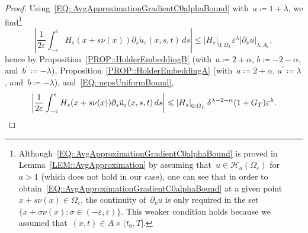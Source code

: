 \documentclass[12pt,a4paper]{amsart}
\makeatletter
\numberwithin{equation}{section}
\theoremstyle{definition}
\theoremstyle{remark}
\newcommand{\eps}{\varepsilon}
\newcommand{\abs}[1]{\left\lvert#1\right\rvert}
\renewcommand{\leq}{\leqslant}
\newcommand{\const}[1]{%
  \csname const@#1\endcsname%
}
\newcommand{\constapp}[1]{%
  \csname constapp@#1\endcsname%
}
\makeatother
\begin{document}
\begin{proof}
    Using~\eqref{EQ::AvgApproximationGradientC0alphaBound} with~$a \coloneq 1+\lambda$, we find\footnote{Although~\eqref{EQ::AvgApproximationGradientC0alphaBound} is proved in Lemma~\ref{LEM::AvgApproximation} by assuming that~$u \in \mathcal{H}_a(\Omega_\eps)$ for~$a > 1$ (which does not hold in our case), one can see that in order to obtain~\eqref{EQ::AvgApproximationGradientC0alphaBound} at a given point~$x + s\nu(x) \in \Omega_\eps$, the continuity of~$\partial_\nu u$ is only required in the set~$\{x + \sigma \nu(x) \colon \sigma \in (-\eps, \eps)\}$. This weaker condition holds because we assumed that~$(x,t) \in A \times (t_0,T]$.} %
    \begin{equation}
        \abs{\frac{1}{2\eps}\int_{-\eps}^\eps H_s(x+s\nu(x)) \partial_s \tilde{u}_\eps(x,s,t)\,ds} \leq \abs{H_s}_{0; \Omega_L}\eps^\lambda\abs{\partial_\nu u}_{\lambda;A_\eps},
    \end{equation}
    hence by Proposition~\ref{PROP::HolderEmbeddingB} (with~$a \coloneq 2+\alpha$, $b \coloneq -2-\alpha$, and~$b^\prime \coloneq -\lambda$), Proposition~\ref{PROP::HolderEmbeddingA} (with~$a \coloneq 2+\alpha$, $a^\prime \coloneq \lambda$, and~$b \coloneq -\lambda$), and~\eqref{EQ::uepsUniformBound},
    \begin{equation}\label{EQ::uUdnuEstimate}
        \abs{\frac{1}{2\eps}\int_{-\eps}^\eps H_s(x+s\nu(x)) \partial_s \tilde{u}_\eps(x,s,t)\,ds} \leq \constapp{CONST::HolderEmbeddingA}\constapp{CONST::HolderEmbeddingB}\abs{H_s}_{0; \Omega_L}\const{CONST::UniformRegularity} \delta^{\lambda-2-\alpha} (1+G_T)\eps^\lambda.
    \end{equation}


\end{proof}
\end{document}

